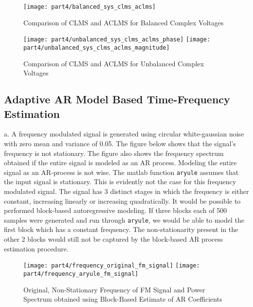 \begin{figure}[H]
\centering{}
\texttt{[image: part4/balanced\_sys\_clms\_aclms]}
\caption{Comparison of CLMS and ACLMS for Balanced Complex Voltages}
\end{figure}

\noindent{}

\begin{figure}[H]
\centering{}
\texttt{[image: part4/unbalanced\_sys\_clms\_aclms\_phase]}
\texttt{[image: part4/unbalanced\_sys\_clms\_aclms\_magnitude]}
\caption{Comparison of CLMS and ACLMS for Unbalanced Complex Voltages}
\label{fig:unbalanced}
\end{figure}


\subsection{Adaptive AR Model Based Time-Frequency Estimation}

\noindent{}a. A frequency modulated signal is generated using circular white-gaussian noise with zero mean and variance of 0.05. The figure below shows that the signal's frequency is not stationary. The figure also shows the frequency spectrum obtained if the entire signal is modeled as an AR process. Modeling the entire signal as an AR-process is not wise. The matlab function \texttt{aryule} assumes that the input signal is stationary. This is evidently not the case for this frequency modulated signal. The signal has 3 distinct stages in which the frequency is either constant, increasing linearly or increasing quadratically. It would be possible to performed block-based autoregressive modeling. If three blocks each of 500 samples were generated and run through \texttt{aryule}, we would be able to model the first block which has a constant frequency. The non-stationarity present in the other 2 blocks would still not be captured by the block-based AR process estimation procedure. 

\begin{figure}[H]
\centering{}
\texttt{[image: part4/frequency\_original\_fm\_signal]}
\texttt{[image: part4/frequency\_aryule\_fm\_signal]}
\caption{Original, Non-Stationary Frequency of FM Signal and Power Spectrum obtained using Block-Based Estimate of AR Coefficients}
\end{figure}

